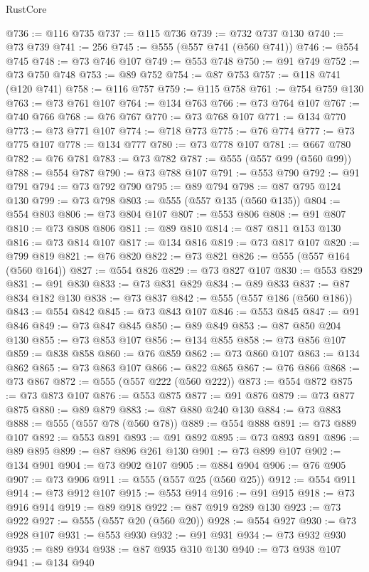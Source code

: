\begin{lexlean}{RustCore}
\begin{coremodule}
@736 := @116 @735
@737 := @115 @736
@739 := @732 @737 @130
@740 := @73 @739
@741 := 256
@745 := @555 (@557 @741 (@560 @741))
@746 := @554 @745
@748 := @73 @746 @107
@749 := @553 @748
@750 := @91 @749
@752 := @73 @750 @748
@753 := @89 @752
@754 := @87 @753
@757 := @118 @741 (@120 @741)
@758 := @116 @757
@759 := @115 @758
@761 := @754 @759 @130
@763 := @73 @761 @107
@764 := @134 @763
@766 := @73 @764 @107
@767 := @740 @766
@768 := @76 @767
@770 := @73 @768 @107
@771 := @134 @770
@773 := @73 @771 @107
@774 := @718 @773
@775 := @76 @774
@777 := @73 @775 @107
@778 := @134 @777
@780 := @73 @778 @107
@781 := @667 @780
@782 := @76 @781
@783 := @73 @782
@787 := @555 (@557 @99 (@560 @99))
@788 := @554 @787
@790 := @73 @788 @107
@791 := @553 @790
@792 := @91 @791
@794 := @73 @792 @790
@795 := @89 @794
@798 := @87 @795 @124 @130
@799 := @73 @798
@803 := @555 (@557 @135 (@560 @135))
@804 := @554 @803
@806 := @73 @804 @107
@807 := @553 @806
@808 := @91 @807
@810 := @73 @808 @806
@811 := @89 @810
@814 := @87 @811 @153 @130
@816 := @73 @814 @107
@817 := @134 @816
@819 := @73 @817 @107
@820 := @799 @819
@821 := @76 @820
@822 := @73 @821
@826 := @555 (@557 @164 (@560 @164))
@827 := @554 @826
@829 := @73 @827 @107
@830 := @553 @829
@831 := @91 @830
@833 := @73 @831 @829
@834 := @89 @833
@837 := @87 @834 @182 @130
@838 := @73 @837
@842 := @555 (@557 @186 (@560 @186))
@843 := @554 @842
@845 := @73 @843 @107
@846 := @553 @845
@847 := @91 @846
@849 := @73 @847 @845
@850 := @89 @849
@853 := @87 @850 @204 @130
@855 := @73 @853 @107
@856 := @134 @855
@858 := @73 @856 @107
@859 := @838 @858
@860 := @76 @859
@862 := @73 @860 @107
@863 := @134 @862
@865 := @73 @863 @107
@866 := @822 @865
@867 := @76 @866
@868 := @73 @867
@872 := @555 (@557 @222 (@560 @222))
@873 := @554 @872
@875 := @73 @873 @107
@876 := @553 @875
@877 := @91 @876
@879 := @73 @877 @875
@880 := @89 @879
@883 := @87 @880 @240 @130
@884 := @73 @883
@888 := @555 (@557 @78 (@560 @78))
@889 := @554 @888
@891 := @73 @889 @107
@892 := @553 @891
@893 := @91 @892
@895 := @73 @893 @891
@896 := @89 @895
@899 := @87 @896 @261 @130
@901 := @73 @899 @107
@902 := @134 @901
@904 := @73 @902 @107
@905 := @884 @904
@906 := @76 @905
@907 := @73 @906
@911 := @555 (@557 @25 (@560 @25))
@912 := @554 @911
@914 := @73 @912 @107
@915 := @553 @914
@916 := @91 @915
@918 := @73 @916 @914
@919 := @89 @918
@922 := @87 @919 @289 @130
@923 := @73 @922
@927 := @555 (@557 @20 (@560 @20))
@928 := @554 @927
@930 := @73 @928 @107
@931 := @553 @930
@932 := @91 @931
@934 := @73 @932 @930
@935 := @89 @934
@938 := @87 @935 @310 @130
@940 := @73 @938 @107
@941 := @134 @940

\end{coremodule}
\end{lexlean}
